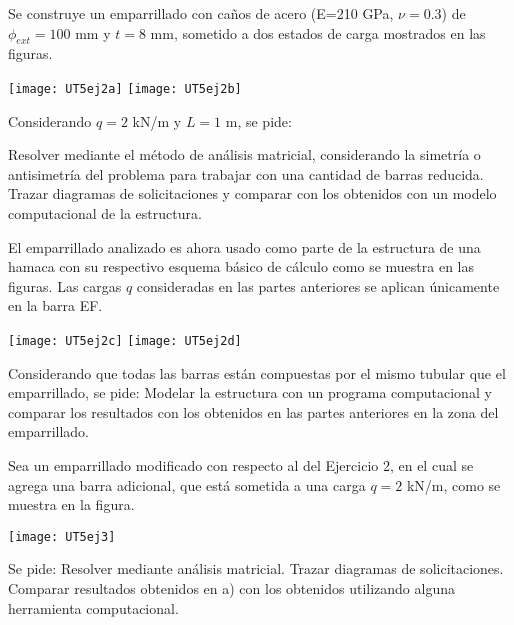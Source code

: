 \ejercicio

Se construye un emparrillado con caños de acero (E=210 GPa, $\nu=0.3$) de $\phi_{ext}=100$ mm y $t=8$ mm, sometido a dos estados de carga mostrados en las figuras.

\begin{center}
	\texttt{[image: UT5ej2a]}
	\hspace{0.1\linewidth}
	\texttt{[image: UT5ej2b]}
\end{center}

Considerando $q=2$ kN/m y $L=1$ m, se pide:

\parte Resolver mediante el método de análisis matricial, considerando la simetría o antisimetría del problema para trabajar con una cantidad de barras reducida.
%
\parte Trazar diagramas de solicitaciones y comparar con los obtenidos con un modelo computacional de la estructura.

\vspace{1cm}
El emparrillado analizado es ahora usado como parte de la estructura de una hamaca con su respectivo esquema básico de cálculo como se muestra en las figuras. %
Las cargas $q$ consideradas en las partes anteriores se aplican únicamente en la barra EF.

\begin{center}
	\texttt{[image: UT5ej2c]}
	\hspace{0.05\linewidth}
	\texttt{[image: UT5ej2d]}
\end{center}

Considerando que todas las barras están compuestas por el mismo tubular que el emparrillado, se pide:
%
\parte Modelar la estructura con un programa computacional y comparar los resultados con los obtenidos en las partes anteriores en la zona del emparrillado. 


\ejercicio

Sea un emparrillado modificado con respecto al del Ejercicio 2, en el cual se agrega una barra adicional, que está sometida a una carga $q=2$ kN/m, como se muestra en la figura.

\begin{center}
	\texttt{[image: UT5ej3]}
\end{center}

Se pide:
\parte Resolver mediante análisis matricial. Trazar diagramas de solicitaciones.
\parte Comparar resultados obtenidos en a) con los obtenidos utilizando alguna herramienta computacional.


